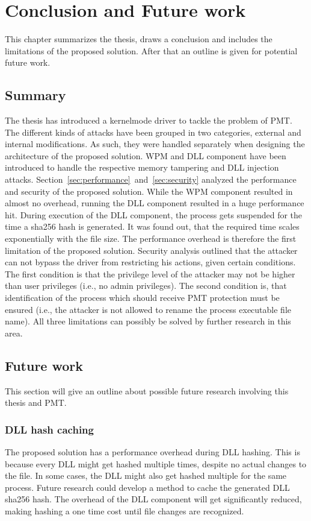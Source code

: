 \section{Conclusion and Future work}
\label{sec:futurework}
This chapter summarizes the thesis, draws a conclusion and includes the limitations of the proposed solution. After that an outline is given for potential future work.
\subsection{Summary}
The thesis has introduced a kernelmode driver to tackle the problem of \gls{PMT}. The different kinds of attacks have been grouped in two categories, external and internal modifications. As such, they were handled separately when designing the architecture of the proposed solution. \gls{WPM} and \gls{DLL} component have been introduced to handle the respective memory tampering and \gls{DLL} injection attacks. Section~\ref{sec:performance}~and~\ref{sec:security} analyzed the performance and security of the proposed solution. While the \gls{WPM} component resulted in almost no overhead, running the \gls{DLL} component resulted in a huge performance hit. During execution of the \gls{DLL} component, the process gets suspended for the time a sha256 hash is generated. It was found out, that the required time scales exponentially with the file size. The performance overhead is therefore the first limitation of the proposed solution. Security analysis outlined that the attacker can not bypass the driver from restricting his actions, given certain conditions. The first condition is that the privilege level of the attacker may not be higher than user privileges (i.e., no admin privileges). The second condition is, that identification of the process which should receive \gls{PMT} protection must be ensured (i.e., the attacker is not allowed to rename the process executable file name). All three limitations can possibly be solved by further research in this area.
\subsection{Future work}
This section will give an outline about possible future research involving this thesis and \gls{PMT}.
\subsubsection{\gls{DLL} hash caching}
The proposed solution has a performance overhead during \gls{DLL} hashing. This is because every \gls{DLL} might get hashed multiple times, despite no actual changes to the file. In some cases, the \gls{DLL} might also get hashed multiple for the same process. Future research could develop a method to cache the generated \gls{DLL} sha256 hash. The overhead of the \gls{DLL} component will get significantly reduced, making hashing a one time cost until file changes are recognized. 

